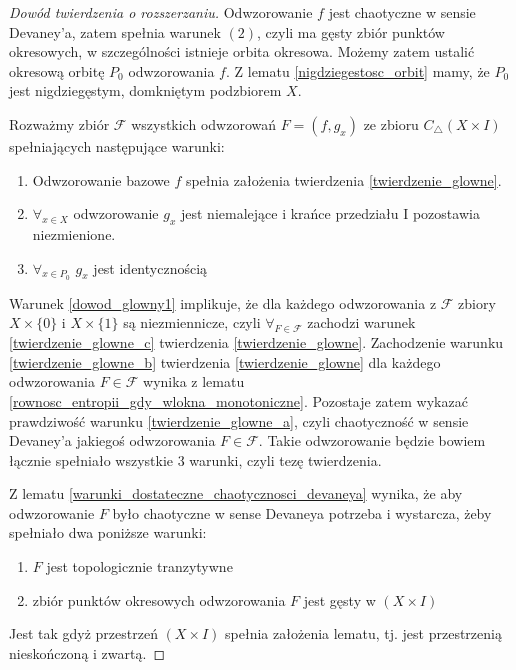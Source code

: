 \documentclass[licencjacka]{pwr_wmat_praca_dyplomowa}
\theoremstyle{plain}
\numberwithin{theorem}{chapter}
\theoremstyle{definition}
\numberwithin{theorem}{chapter}
\begin{document}
\begin{proof}[Dowód twierdzenia o rozszerzaniu]
Odwzorowanie $f$ jest chaotyczne w sensie Devaney'a, zatem spełnia warunek $(2)$, czyli ma gęsty zbiór punktów okresowych, w szczególności istnieje orbita okresowa.
Możemy zatem ustalić okresową orbitę $P_0$ odwzorowania $f$. Z lematu \ref{nigdziegestosc_orbit} mamy, że $P_0$ jest nigdziegęstym, domkniętym podzbiorem $X$.

Rozważmy zbiór $\mathcal{F}$ wszystkich odwzorowań $F = (f, g_x)$ ze zbioru $C_\triangle(X \times I)$ spełniających następujące warunki:
\begin{enumerate}
\item\label{dowod_glowny_a} Odwzorowanie bazowe $f$ spełnia założenia twierdzenia \ref{twierdzenie_glowne}.
\item\label{dowod_glowny_b} $\forall_{x \in X}$ odwzorowanie $g_x$ jest niemalejące i krańce przedziału I pozostawia niezmienione.
\item\label{dowod_glowny_c} $\forall_{x \in P_0}$ $g_x$ jest identycznością 
\end{enumerate}

Warunek \ref{dowod_glowny1} implikuje, że dla każdego odwzorowania z $\mathcal{F}$ zbiory $X \times \{0\}$ i $X \times \{1\}$ są niezmiennicze, czyli $\forall_{F \in \mathcal{F}}$ zachodzi warunek \ref{twierdzenie_glowne_c}  twierdzenia \ref{twierdzenie_glowne}.
Zachodzenie warunku \ref{twierdzenie_glowne_b} twierdzenia \ref{twierdzenie_glowne} dla każdego odwzorowania $F \in \mathcal{F}$ wynika z lematu \ref{rownosc_entropii_gdy_wlokna_monotoniczne}.
Pozostaje zatem wykazać prawdziwość warunku \ref{twierdzenie_glowne_a}, czyli chaotyczność w sensie Devaney'a jakiegoś odwzorowania $F \in \mathcal{F}$. Takie odwzorowanie będzie bowiem łącznie spełniało wszystkie 3 warunki, czyli tezę twierdzenia.

Z lematu \ref{warunki_dostateczne_chaotycznosci_devaneya} wynika, że aby odwzorowanie $F$ było chaotyczne w sense Devaneya potrzeba i wystarcza, żeby spełniało dwa poniższe warunki:
\begin{enumerate}
\item \label{devaney_pierwsza_wlasnosc} $F$ jest topologicznie tranzytywne
\item \label{devaney_druga_wlasnosc} zbiór punktów okresowych odwzorowania $F$ jest gęsty w $(X \times I)$
\end{enumerate}
Jest tak gdyż przestrzeń $(X \times I)$ spełnia założenia lematu, tj. jest przestrzenią nieskończoną i zwartą.


\end{proof}
\end{document}
